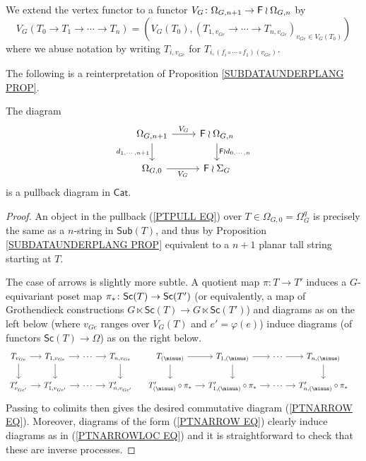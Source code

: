 \documentclass[a4paper,10pt]{article}%
\begin{document}
\begin{notation}
We extend the vertex functor to a functor 
$V_G \colon \Omega_{G,n+1} \to \mathsf{F} \wr \Omega_{G,n}$
by
\[
	V_G(T_0 \to T_1 \to \cdots \to T_n) = 
	\left(
	V_G(T_0), (T_{1,v_{Ge}} \to \cdots \to
	T_{n,v_{Ge}})_{v_{Ge} \in V_G(T_0)}
	\right)
\]
where we abuse notation by writing $T_{i,v_{Ge}}$
for $T_{i, (f_i\circ \cdots \circ f_1)(v_{Ge})}$.
\end{notation}


The following is a reinterpretation of Proposition \ref{SUBDATAUNDERPLANG PROP}.

\begin{proposition} \label{SUBSASPULL PROP}
The diagram
	\begin{equation}\label{PTPULL EQ}
	\begin{tikzcd}
		\Omega_{G,n+1} \ar{r}{V_G} 
		\ar{d}[swap]{d_{1,\cdots,n+1}} & \Fin \wr \Omega_{G,n} 
		\ar{d}{\Fin \wr d_{0,\cdots,n}}
	\\
		\Omega_{G,0} \ar{r}[swap]{V_G} & \Fin \wr \Sigma_G
	\end{tikzcd}
	\end{equation}
is a pullback diagram in $\mathsf{Cat}$.
\end{proposition}


\begin{proof}
	An object in the pullback (\ref{PTPULL EQ}) over 
	$T\in \Omega_{G,0} = \Omega_G^q$ is precisely the same as a $n$-string in $\mathsf{Sub}(T)$, and thus by Proposition \ref{SUBDATAUNDERPLANG PROP} equivalent to a $n+1$ planar tall string starting at $T$.
	
	The case of arrows is slightly more subtle. A quotient map $\pi \colon T \to T'$ induces a $G$-equivariant poset map 
	$\pi_{\**} \colon \mathsf{Sc}(T) \to \mathsf{Sc}(T')$ 
	(or equivalently, a map of Grothendieck constructions 
	$G \ltimes \mathsf{Sc}(T) \to G \ltimes \mathsf{Sc}(T')$)
	and diagrams as on the left below (where $v_{Ge}$ ranges over $V_G(T)$ and $e'=\varphi(e)$) induce diagrams (of functors $\mathsf{Sc}(T) \to \Omega$) as on the right below.
	\begin{equation} \label{PTNARROWLOC EQ}
	\begin{tikzcd}[column sep=1.2em]
	T_{v_{G e}} \ar{r}{} \ar{d}[swap]{} & 
	T_{1,v_{G e}} \ar{r}{} \ar{d}[swap]{} &
	\cdots \ar{r}{} &
	T_{n,v_{G e}} \ar{d}{} &
	T_{(\minus)} \ar{r}{} \ar{d}[swap]{} & 
	T_{1,(\minus)} \ar{r}{} \ar{d}[swap]{} &
	\cdots \ar{r}{} &
	T_{n,(\minus)} \ar{d}{} &
\\
	T'_{v_{G e'}} \ar{r}{} &
	T'_{1,v_{G e'}} \ar{r}{} &
	\cdots \ar{r}{} &
	T'_{n,v_{G e'}} &
	T'_{(\minus)}\circ \pi_{\**} \ar{r}{} &
	T'_{1,(\minus)}\circ \pi_{\**} \ar{r}{} &
	\cdots \ar{r}{} &
	T'_{n,(\minus)}\circ \pi_{\**} &
	\end{tikzcd}	
	\end{equation}
Passing to colimits then gives the desired commutative diagram (\ref{PTNARROW EQ}). Moreover, diagrams of the form (\ref{PTNARROW EQ}) clearly induce diagrams as in  (\ref{PTNARROWLOC EQ}) and it is straightforward to check that these are inverse processes. 
\end{proof}
\end{document}

